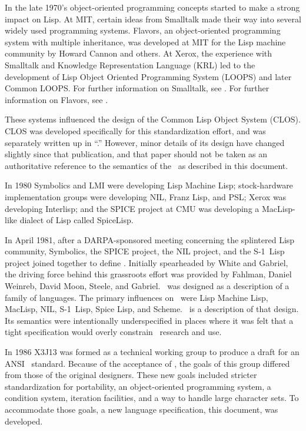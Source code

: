 In the late 1970's object-oriented programming concepts started to
make a strong impact on Lisp. 
At MIT, certain ideas from Smalltalk made their way into several
widely used programming systems.
Flavors, an object-oriented programming system with multiple inheritance, 
was developed at MIT for the Lisp machine community by Howard Cannon and others.
At Xerox, the experience with Smalltalk and 
Knowledge Representation Language (KRL) led to the development of 
Lisp Object Oriented Programming System (LOOPS) and later Common LOOPS.
For further information on Smalltalk, see {\SmalltalkBook}.
For further information on Flavors, see {\FlavorsPaper}.

These systems influenced the design of the Common Lisp Object System (CLOS).
CLOS was developed specifically for this standardization effort,
and was separately written up in ``\CLOSPaper.''  However, minor details
of its design have changed slightly since that publication, and that paper 
should not be taken as an authoritative reference to the semantics of the
\CLOS\ as described in this document.

In 1980 Symbolics and LMI were developing Lisp Machine Lisp; stock-hardware
implementation groups were developing NIL, Franz Lisp, and PSL; Xerox
was developing Interlisp; and the SPICE project at CMU was developing
a MacLisp-like dialect of Lisp called SpiceLisp.
 
In April 1981, after a DARPA-sponsored meeting concerning the
splintered Lisp community, Symbolics, the SPICE project, the NIL
project, and the \hbox{S-1}~Lisp project joined together to define
\clisp.  Initially spearheaded by White and Gabriel, the
driving force behind this grassroots effort was provided by Fahlman,
Daniel Weinreb, David Moon, Steele,  and Gabriel.
\clisp\ was designed as a description of a family of languages.  The
primary influences on \clisp\ were Lisp Machine Lisp, MacLisp, NIL,
\hbox{S-1}~Lisp, Spice Lisp, and Scheme.
\CLtL\ is a description of that design.  Its
semantics were intentionally underspecified in places where it was
felt that a tight specification would overly constrain \clisp\
research and use.



In 1986 X3J13 was formed as a technical working group to
produce a draft for an ANSI \clisp\ standard. Because of the
acceptance of \clisp, the goals of this group differed from those of
the original designers. These new goals included stricter
standardization for portability, an object-oriented programming
system, a condition system, iteration facilities, and a way to handle
large character sets.  To accommodate those
goals, a new language specification, this
document, was developed.
 
\endsubSection%

